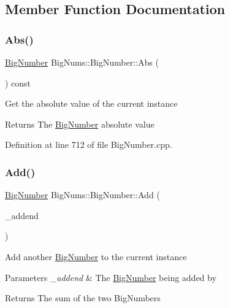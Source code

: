 \subsection{Member Function Documentation}
\mbox{\label{class_big_nums_1_1_big_number_ae4675cb61567802acb26e194d63ac454}} 
\subsubsection{\texorpdfstring{Abs()}{Abs()}}
{\footnotesize\ttfamily \mbox{\hyperlink{class_big_nums_1_1_big_number}{Big\+Number}} Big\+Nums\+::\+Big\+Number\+::\+Abs (\begin{DoxyParamCaption}{ }\end{DoxyParamCaption}) const}

Get the absolute value of the current instance \begin{DoxyReturn}{Returns}
The \mbox{\hyperlink{class_big_nums_1_1_big_number}{Big\+Number}} absolute value 
\end{DoxyReturn}


Definition at line 712 of file Big\+Number.\+cpp.

\mbox{\label{class_big_nums_1_1_big_number_aead85993ce069442f7b15cca8c81df39}} 
\subsubsection{\texorpdfstring{Add()}{Add()}}
{\footnotesize\ttfamily \mbox{\hyperlink{class_big_nums_1_1_big_number}{Big\+Number}} Big\+Nums\+::\+Big\+Number\+::\+Add (\begin{DoxyParamCaption}\item[{const \mbox{\hyperlink{class_big_nums_1_1_big_number}{Big\+Number}} \&}]{\+\_\+addend }\end{DoxyParamCaption})}

Add another \mbox{\hyperlink{class_big_nums_1_1_big_number}{Big\+Number}} to the current instance 
\begin{DoxyParams}{Parameters}
{\em \+\_\+addend} & The \mbox{\hyperlink{class_big_nums_1_1_big_number}{Big\+Number}} being added by \\
\hline
\end{DoxyParams}
\begin{DoxyReturn}{Returns}
The sum of the two Big\+Numbers 
\end{DoxyReturn}


